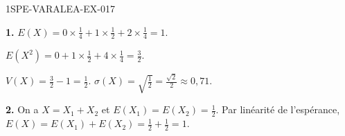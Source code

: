 \begin{corrige}{1SPE-VARALEA-EX-017}

\textbf{1.} $E(X) = 0 \times \frac{1}{4} + 1 \times \frac{1}{2} + 2 \times \frac{1}{4} = 1$.

$E(X^2) = 0 + 1 \times \frac{1}{2} + 4 \times \frac{1}{4} = \frac{3}{2}$.

$V(X) = \frac{3}{2} - 1 = \frac{1}{2}$. \quad $\sigma(X) = \sqrt{\frac{1}{2}} = \frac{\sqrt{2}}{2} \approx 0{,}71$.

\medskip
\textbf{2.} On a $X=X_1+X_2$ et $E(X_1)=E(X_2)=\frac12$.
Par linéarité de l'espérance,
$E(X)=E(X_1)+E(X_2)=\frac12+\frac12=1$. \checkmark

\end{corrige}
